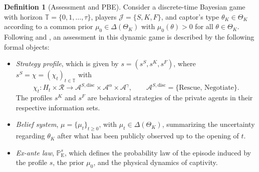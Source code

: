 \documentclass[pdflatex,sn-mathphys-ay]{sn-jnl}
\providecommand{\textcite}{\citet}
\theoremstyle{plain}
\theoremstyle{definition}
\newtheorem{definition}[theorem]{Definition}
\newcommand{\ProbE}{\mathbb{P}_{\mathrm{E}}}
\newcommand{\ThetaK}{\Theta_K}
\newcommand{\1}{\mathbf{1}}
\begin{document}
\begin{definition}[Assessment and PBE]
\label{def:pbe-mechanism}
Consider a discrete-time Bayesian game with horizon $\mathbb{T}=\{0,1,\ldots,\tau\}$, players $\mathcal{J}=\{S,K,F\}$, and captor's type $\theta_K\in\ThetaK$ according to a common prior $\mu_0\in\Delta(\ThetaK)$ with $\mu_0(\theta)>0$ for all $\theta\in\ThetaK$. Following \textcite{FudenbergTirole1991} and \textcite{KrepsWilson1982}, an assessment in this dynamic game is described by the following formal objects:

\begin{itemize}
  \item \emph{Strategy profile}, which is given by $s=(s^S,s^K,s^F)$, where $s^S=\chi=(\chi_t)_{t\in\mathbb{T}}$ with
  \[
    \chi_t \colon H_t\times\mathcal{R}
    \longrightarrow \mathcal{A}^{S,\mathrm{disc}}\times\mathcal{A}^{\alpha}\times\mathcal{A}^{\gamma},
    \qquad
    \mathcal{A}^{S,\mathrm{disc}}=\{\text{Rescue},\,\text{Negotiate}\}.
  \]
  The profiles $s^K$ and $s^F$ are behavioral strategies of the private agents in their respective information sets.
  \item \emph{Belief system}, $\mu=\{\mu_t\}_{t\ge 0}$, with $\mu_t\in\Delta(\ThetaK)$, summarizing the uncertainty regarding $\theta_K$ after what has been publicly observed up to the opening of $t$.
  \item \emph{Ex-ante law}, $\ProbE^s$, which defines the probability law of the episode induced by the profile $s$, the prior $\mu_0$, and the physical dynamics of captivity.
\end{itemize}


\end{definition}
\end{document}
